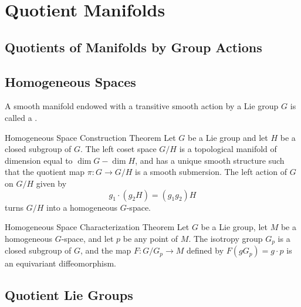 \documentclass[../main.tex]{subfiles}
\begin{document}
\ifSubfilesClassLoaded{

    
}{}

\chapter{ Quotient Manifolds }
\section{Quotients of Manifolds by Group Actions}


\section{Homogeneous Spaces}

\begin{definition}{}{}
     A smooth manifold endowed with a transitive smooth action by a Lie group $G$ is called a  .
\end{definition}
\begin{theorem}{Homogeneous Space Construction Theorem}{}
Let $G$ be a Lie group and let $H$ be a closed subgroup of $G$. The left coset space $G/H$ is a topological manifold of dimension equal to $\operatorname{dim} G - \operatorname{dim} H$, and has a unique smooth structure such that the quotient map $\pi : G \to G/H$ is a smooth submersion. The left action of $G$ on $G/H$ given by
\begin{equation}
g_1 \cdot (g_2 H) = (g_1 g_2) H \tag{21.3}
\end{equation}
turns $G/H$ into a homogeneous $G$-space.
\end{theorem}

\begin{theorem}{Homogeneous Space Characterization Theorem}{}
Let $G$ be a Lie group, let $M$ be a homogeneous $G$-space, and let $p$ be any point of $M$. The isotropy group $G_p$ is a closed subgroup of $G$, and the map $F: G/G_p \to M$ defined by $F(gG_p) = g \cdot p$ is an equivariant diffeomorphism.
\end{theorem}

\section{Quotient Lie Groups}
\end{document}
